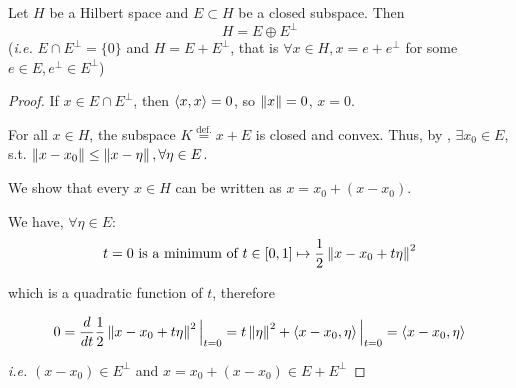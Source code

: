 \documentclass{article}
\begin{document}
\begin{corollary} \nextline
	Let $H$ be a Hilbert space and $E \subset H$ be a closed subspace. Then
	$$
		H = E \oplus E^{\perp}
	$$
	(\textit{i.e.} $E \cap E^{\perp} = \{0\}$ and $H = E + E^{\perp}$, that is $\forall x \in H, x=e+ e^{\perp}$ for some $e \in E, e^{\perp} \in E^{\perp}$)
\end{corollary}

\begin{proof}
	If $x \in E\cap E^{\perp}$, then $\left<{x},{x}\right>=0$, so $\left\|{x}\right\|=0$, $x=0$.

	For all $x\in H$, the subspace $K\overset{\text{def.}}{=}x+E$ is closed and convex.
	Thus, by , $\exists x_0 \in E$, s.t. $\left\|{x-x_0}\right\| \leq \left\|{x-\eta}\right\|, \forall \eta \in E$.
	\begin{unexaminable}
		We show that every $x\in H$ can be written as $x=x_0+(x-x_0)$.
	\end{unexaminable}

	We have, $\forall \eta \in E$:
	\begin{equation*}
		t=0 \text{\ is\ a\ minimum\ of\ } t\in [0,1] \mapsto \frac{1}{2} \left\|{x-x_0+t\eta}\right\|^2
	\end{equation*}

	which is a quadratic function of $t$, therefore

	\begin{equation*}
		0=\frac{d}{dt}\frac{1}{2} \left\|{x-x_0+t\eta}\right\|^2 \Big|_{t=0} = t\left\|{\eta}\right\|^2 + \left<{x-x_0},{\eta}\right> \Big|_{t=0}=\left<{x-x_0},{\eta}\right>
	\end{equation*}

	\textit{i.e.} $(x-x_0) \in E^{\perp}$ and $x=x_0+(x-x_0) \in E+E^{\perp}$
\end{proof}
\end{document}
